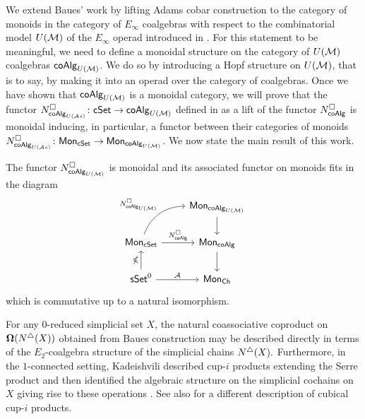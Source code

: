 We extend Baues' work by lifting Adams cobar construction to the category of monoids in the category of $E_\infty$ coalgebras with respect to the combinatorial model $U(\mathcal{M})$ of the $E_\infty$ operad introduced in \cite{medina2020prop1}.
For this statement to be meaningful, we need to define a monoidal structure on the category of $U(\mathcal{M})$ coalgebras $\mathsf{coAlg}_{U(\mathcal{M})}$.
We do so by introducing a Hopf structure on $U(\mathcal{M})$, that is to say, by making it into an operad over the category of coalgebras.
Once we have shown that $\mathsf{coAlg}_{U(\mathcal{M})}$ is a monoidal category, we will prove that the functor $N^{\square}_{\mathsf{coAlg}_{U(\mathcal{A}s)}} \colon \mathsf{cSet} \to \mathsf{coAlg}_{U(\mathcal{M})}$ defined in \cite{medina2021cubical} as a lift of the functor $N^{\square}_{\mathsf{coAlg}}$ is monoidal inducing, in particular, a functor between their categories of monoids $N^{\square}_{\mathsf{coAlg}_{U(\mathcal{A}s)}} \colon \mathsf{Mon}_{\mathsf{cSet}} \to \mathsf{Mon}_{\mathsf{coAlg}_{U(\mathcal{M})}}$.
We now state the main result of this work.

\begin{theorem} \label{t:1st main thm in the intro}
    The functor $N^{\square}_{\mathsf{coAlg}_{U(\mathcal{M})}}$ is monoidal and its associated functor on monoids fits in the diagram
    \begin{equation*}
    \begin{tikzcd}
    & \Mon_{\coAlg_{U(\M)}} \arrow[d] \\
    \Mon_{\cSet} \arrow[ru, "\cchains_{\coAlg_{U(\M)}}", out=70, in=180] \arrow[r, "\cchains_\coAlg"]
    & \Mon_{\coAlg} \arrow[d] \\
    \sSet^0 \arrow[r, "\mathcal A"] \arrow[u, "\gcobar"]
    & \Mon_{\Ch}
    \end{tikzcd}
    \end{equation*}
    which is commutative up to a natural isomorphism.
\end{theorem} 








For any $0$-reduced simplicial set $X$, the natural coassociative coproduct on $\mathbf{\Omega} (N^{\triangle} (X))$ obtained from Baues construction may be described directly in terms of the $E_2$-coalgebra structure of the simplicial chains $N^{\triangle}(X).$ Furthermore, in the $1$-connected setting, Kadeishvili described cup-$i$ products extending the Serre product and then identified the algebraic structure on the simplicial cochains on $X$ giving rise to these operations \cite{kadeishvili1999coproducts, kadeishvili2003cup-i}.
See also \cite{pilarczyk2016cubical} for a different description of cubical cup-$i$ products.

